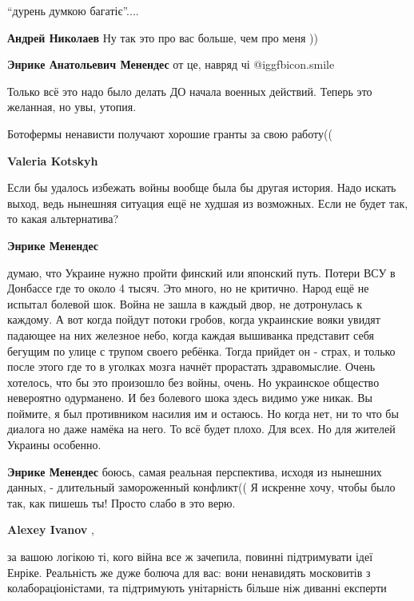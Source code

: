 \begin{itemize}
\enquote{дурень думкою багатіє}....

\begin{itemize} %
\textbf{Андрей Николаев} Ну так это про вас больше, чем про меня ))

\textbf{Энрике Анатольевич Менендес} от це, навряд чі  @igg{fbicon.smile} 

\end{itemize} %


Только всё это надо было делать ДО начала военных действий. Теперь это
желанная, но увы, утопия.

Ботофермы ненависти получают хорошие гранты за свою работу((

\begin{itemize} %
\textbf{Valeria Kotskyh} 

Если бы удалось избежать войны вообще была бы другая история. Надо искать
выход, ведь нынешняя ситуация ещё не худшая из возможных. Если не будет так, то
какая альтернатива?

\textbf{Энрике Менендес} 

думаю, что Украине нужно пройти финский или японский путь. Потери ВСУ в
Донбассе где то около 4 тысяч. Это много, но не критично. Народ ещё не испытал
болевой шок. Война не зашла в каждый двор, не дотронулась к каждому. А вот
когда пойдут потоки гробов, когда украинские вояки увидят падающее на них
железное небо, когда каждая вышиванка представит себя бегущим по улице с трупом
своего ребёнка. Тогда прийдет он - страх, и только после этого где то в уголках
мозга начнёт прорастать здравомыслие. Очень хотелось, что бы это произошло без
войны, очень. Но украинское общество невероятно одурманено. И без болевого шока
здесь видимо уже никак. Вы поймите, я был противником насилия им и остаюсь. Но
когда нет, ни то что бы диалога но даже намёка на него. То всё будет плохо. Для
всех. Но для жителей Украины особенно.

\textbf{Энрике Менендес} боюсь, самая реальная перспектива, исходя из нынешних данных, - длительный замороженный конфликт((
Я искренне хочу, чтобы было так, как пишешь ты! Просто слабо в это верю.

\textbf{Alexey Ivanov} , 

за вашою логікою ті, кого війна все ж зачепила, повинні підтримувати ідеї
Енріке. Реальність же дуже болюча для вас: вони ненавидять московитів з
колабораціоністами, та підтримують унітарність більше ніж диванні експерти



\end{itemize}
\end{itemize}

